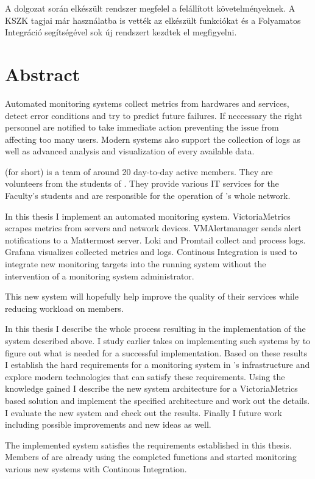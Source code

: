 A dolgozat során elkészült rendszer megfelel a felállított követelményeknek. A
KSZK tagjai már használatba is vették az elkészült funkciókat és a Folyamatos
Integráció segítségével sok új rendszert kezdtek el megfigyelni.


\vfill
\selectenglish


\chapter*{Abstract}

Automated monitoring systems collect metrics from hardwares and services,
detect error conditions and try to predict future failures. If neccessary the
right personnel are notified to take immediate action preventing the issue from
affecting too many users. Modern systems also support the collection of logs as
well as advanced analysis and visualization of every available data.

\kszkfull (\kszk for short) is a team of around 20 day-to-day active members.
They are volunteers from the students of \vik. They provide various IT services
for the Faculty's students and are responsible for the operation of \schfull's
whole network.

In this thesis I implement an automated monitoring system. VictoriaMetrics
scrapes metrics from servers and network devices. VMAlertmanager sends alert
notifications to a Mattermost server. Loki and Promtail collect and process
logs. Grafana visualizes collected metrics and logs. Continous Integration is
used to integrate new monitoring targets into the running system without the
intervention of a monitoring system administrator.

This new system will hopefully help \kszk improve the quality of their services
while reducing workload on members.

In this thesis I describe the whole process resulting in the implementation of
the system described above. I study earlier takes on implementing such systems
by \kszk to figure out what is needed for a successful implementation. Based on
these results I establish the hard requirements for a monitoring system in
\kszk's infrastructure and explore modern technologies that can satisfy these
requirements. Using the knowledge gained I describe the new system architecture
for a VictoriaMetrics based solution and implement the specified architecture
and work out the details. I evaluate the new system and check out the results.
Finally I future work including possible improvements and new ideas as well.

The implemented system satisfies the requirements established in this thesis.
Members of \kszk are already using the completed functions and started
monitoring various new systems with Continous Integration.


\vfill
\cleardoublepage

\selectthesislanguage

\setcounter{romanPage}{\value{page}}
